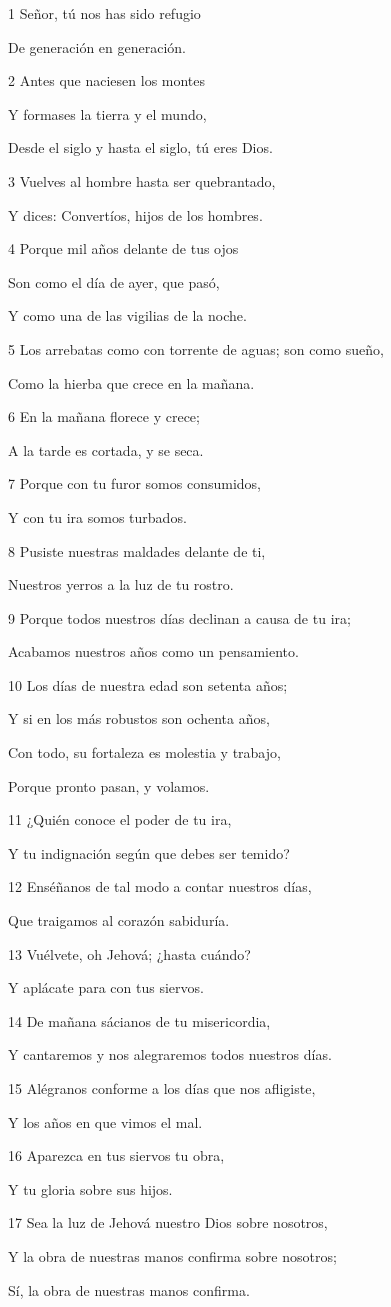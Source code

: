 \par 1 Señor, tú nos has sido refugio
\par De generación en generación.
\par 2 Antes que naciesen los montes
\par Y formases la tierra y el mundo,
\par Desde el siglo y hasta el siglo, tú eres Dios.
\par 3 Vuelves al hombre hasta ser quebrantado,
\par Y dices: Convertíos, hijos de los hombres.
\par 4 Porque mil años delante de tus ojos
\par Son como el día de ayer, que pasó,
\par Y como una de las vigilias de la noche.
\par 5 Los arrebatas como con torrente de aguas; son como sueño,
\par Como la hierba que crece en la mañana.
\par 6 En la mañana florece y crece;
\par A la tarde es cortada, y se seca.
\par 7 Porque con tu furor somos consumidos,
\par Y con tu ira somos turbados.
\par 8 Pusiste nuestras maldades delante de ti,
\par Nuestros yerros a la luz de tu rostro.
\par 9 Porque todos nuestros días declinan a causa de tu ira;
\par Acabamos nuestros años como un pensamiento.
\par 10 Los días de nuestra edad son setenta años;
\par Y si en los más robustos son ochenta años,
\par Con todo, su fortaleza es molestia y trabajo,
\par Porque pronto pasan, y volamos.
\par 11 ¿Quién conoce el poder de tu ira,
\par Y tu indignación según que debes ser temido?
\par 12 Enséñanos de tal modo a contar nuestros días,
\par Que traigamos al corazón sabiduría.
\par 13 Vuélvete, oh Jehová; ¿hasta cuándo?
\par Y aplácate para con tus siervos.
\par 14 De mañana sácianos de tu misericordia,
\par Y cantaremos y nos alegraremos todos nuestros días.
\par 15 Alégranos conforme a los días que nos afligiste,
\par Y los años en que vimos el mal.
\par 16 Aparezca en tus siervos tu obra,
\par Y tu gloria sobre sus hijos.
\par 17 Sea la luz de Jehová nuestro Dios sobre nosotros,
\par Y la obra de nuestras manos confirma sobre nosotros;
\par Sí, la obra de nuestras manos confirma.

